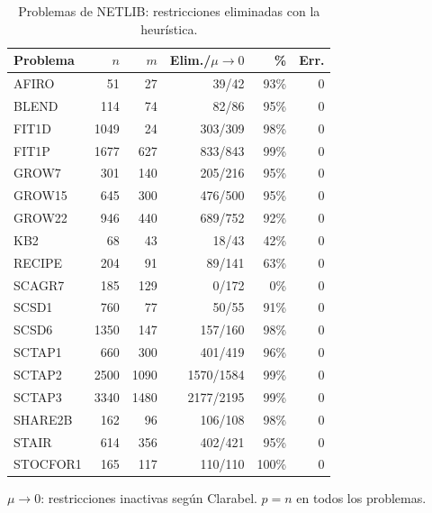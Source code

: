 \begin{table}[H]
\centering
\caption{Problemas de NETLIB: restricciones eliminadas con la heurística.}
\label{tab:netlib}
\small
\begin{tabular}{l r r r r r}
\toprule
Problema & $n$ & $m$ & Elim./$\mu\to0$ & \% & Err. \\
\midrule
AFIRO & 51 & 27 & 39/42 & 93\% & 0 \\
BLEND & 114 & 74 & 82/86 & 95\% & 0 \\
FIT1D & 1049 & 24 & 303/309 & 98\% & 0 \\
FIT1P & 1677 & 627 & 833/843 & 99\% & 0 \\
GROW7 & 301 & 140 & 205/216 & 95\% & 0 \\
GROW15 & 645 & 300 & 476/500 & 95\% & 0 \\
GROW22 & 946 & 440 & 689/752 & 92\% & 0 \\
KB2 & 68 & 43 & 18/43 & 42\% & 0 \\
RECIPE & 204 & 91 & 89/141 & 63\% & 0 \\
SCAGR7 & 185 & 129 & 0/172 & 0\% & 0 \\
SCSD1 & 760 & 77 & 50/55 & 91\% & 0 \\
SCSD6 & 1350 & 147 & 157/160 & 98\% & 0 \\
SCTAP1 & 660 & 300 & 401/419 & 96\% & 0 \\
SCTAP2 & 2500 & 1090 & 1570/1584 & 99\% & 0 \\
SCTAP3 & 3340 & 1480 & 2177/2195 & 99\% & 0 \\
SHARE2B & 162 & 96 & 106/108 & 98\% & 0 \\
STAIR & 614 & 356 & 402/421 & 95\% & 0 \\
STOCFOR1 & 165 & 117 & 110/110 & 100\% & 0 \\
\bottomrule
\end{tabular}

\vspace{0.3em}
\footnotesize
$\mu\to0$: restricciones inactivas según Clarabel. $p = n$ en todos los problemas.
\end{table}

